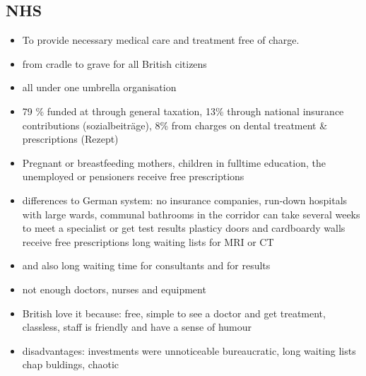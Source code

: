 \documentclass[a5paper,12pt,twoside,titlepage]{scrartcl}
\begin{document}
	\subsection{NHS}
	\begin{itemize}
		\item To provide necessary medical care and treatment free of charge. 
		\item from cradle to grave for all British citizens
		\item all under one umbrella organisation
		\item  79 \% funded at through general taxation, 13\% through national insurance contributions (sozialbeiträge), 8\% from charges on dental treatment \& prescriptions (Rezept)
		\item Pregnant or breastfeeding mothers, children in fulltime education, the unemployed or pensioners receive free prescriptions
		\item differences to German system: 
		\subitem no insurance companies, 
		\subitem run-down hospitals with large wards, communal bathrooms in the corridor
		\subitem can take several weeks to meet a specialist or get test results
		\subitem plasticy doors and cardboardy walls
		\subitem receive free prescriptions
		\subitem long waiting lists for MRI or CT
		\item and also long waiting time for consultants and for results
		\item not enough doctors, nurses and equipment
		\item British love it because:
		\subitem free, simple to see a doctor and get treatment, 
		\subitem classless, staff is friendly and have a sense of humour
		\item disadvantages: 
		\subitem investments were unnoticeable
		\subitem bureaucratic, long waiting lists
		\subitem chap buldings, chaotic
	\end{itemize}
\end{document}

